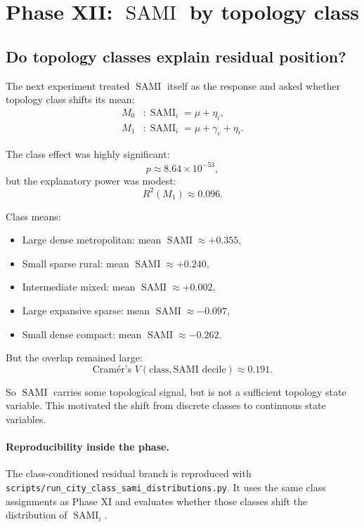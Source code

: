 \documentclass[11pt]{article}
\newcommand{\SAMI}{\operatorname{SAMI}}
\begin{document}
\section{Phase XII: \(\SAMI\) by topology class}

\subsection{Do topology classes explain residual position?}

The next experiment treated \(\SAMI\) itself as the response and asked whether topology class shifts its mean:
\begin{align}
M_0 &: \SAMI_i = \mu + \eta_i,\\
M_1 &: \SAMI_i = \mu + \gamma_c + \eta_i.
\end{align}

The class effect was highly significant:
\begin{equation}
p \approx 8.64\times 10^{-53},
\end{equation}
but the explanatory power was modest:
\begin{equation}
R^2(M_1) \approx 0.096.
\end{equation}

Class means:
\begin{itemize}
\item Large dense metropolitan: mean \(\SAMI \approx +0.355\),
\item Small sparse rural: mean \(\SAMI \approx +0.240\),
\item Intermediate mixed: mean \(\SAMI \approx +0.002\),
\item Large expansive sparse: mean \(\SAMI \approx -0.097\),
\item Small dense compact: mean \(\SAMI \approx -0.262\).
\end{itemize}

But the overlap remained large:
\begin{equation}
\text{Cram\'er's } V(\text{class},\text{SAMI decile}) \approx 0.191.
\end{equation}

So \(\SAMI\) carries some topological signal, but is not a sufficient topology state variable. This motivated the shift from discrete classes to continuous state variables.

\paragraph{Reproducibility inside the phase.}
The class-conditioned residual branch is reproduced with
\texttt{scripts/run\_city\_class\_sami\_distributions.py}.
It uses the same class assignments as Phase XI and evaluates whether those classes shift the distribution of \(\SAMI_i\).
\end{document}
